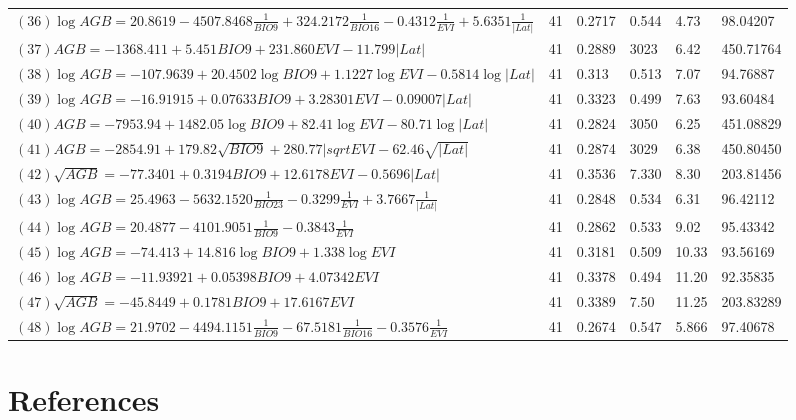 \documentclass[review, authoryear]{elsarticle}   	%
\begin{document}
\begin{table}[htbp]
\begin{tabular}{p{8cm}p{0.5cm}p{1.0cm}p{1.0cm}p{1.0cm}p{1.0cm}}
$(36)\log{AGB}=20.8619-4507.8468\frac{1}{BIO9}+324.2172\frac{1}{BIO16}-0.4312\frac{1}{EVI}+5.6351\frac{1}{|Lat|}$&41&0.2717&0.544&4.73&98.04207\\ 
$(37)AGB=-1368.411+5.451BIO9+231.860EVI-11.799|Lat|$&41&0.2889&3023&6.42&450.71764\\
$(38)\log{AGB}=-107.9639+20.4502\log{BIO9}+1.1227\log{EVI}-0.5814\log{|Lat|}$&41&0.313&0.513&7.07&94.76887\\
$(39)\log{AGB}=-16.91915+0.07633BIO9+3.28301EVI-0.09007|Lat|$&41&0.3323&0.499&7.63&93.60484\\
$(40)AGB=-7953.94+1482.05\log{BIO9}+82.41\log{EVI}-80.71\log{|Lat|}$&41&0.2824&3050&6.25&451.08829\\ 
$(41)AGB=-2854.91+179.82\sqrt{BIO9}+280.77|sqrt{EVI}-62.46\sqrt{|Lat|}$&41&0.2874&3029&6.38&450.80450\\
$(42)\sqrt{AGB}=-77.3401+0.3194BIO9+12.6178EVI-0.5696|Lat|$&41&0.3536&7.330&8.30&203.81456\\
$(43)\log{AGB}=25.4963-5632.1520\frac{1}{BIO23}-0.3299\frac{1}{EVI}+3.7667\frac{1}{|Lat|}$&41&0.2848&0.534&6.31&96.42112\\
$(44)\log{AGB}=20.4877-4101.9051\frac{1}{BIO9}-0.3843\frac{1}{EVI}$ &41&0.2862&0.533&9.02&95.43342\\
$(45)\log{AGB}=-74.413+14.816\log{BIO9}+1.338\log{EVI}$&41&0.3181&0.509&10.33&93.56169\\
$(46)\log{AGB}=-11.93921+0.05398BIO9+4.07342EVI$&41&0.3378&0.494&11.20&92.35835\\
$(47)\sqrt{AGB}=-45.8449+0.1781BIO9+17.6167EVI$&41&0.3389&7.50&11.25&203.83289\\   
$(48)\log{AGB}=21.9702-4494.1151\frac{1}{BIO9}-67.5181\frac{1}{BIO16}-0.3576\frac{1}{EVI}$ &41&0.2674&0.547&5.866&97.40678\\
      \bottomrule
  \end{tabular}
   \label{tab:models}
\end{table}


\section*{References}


%
\end{document}
